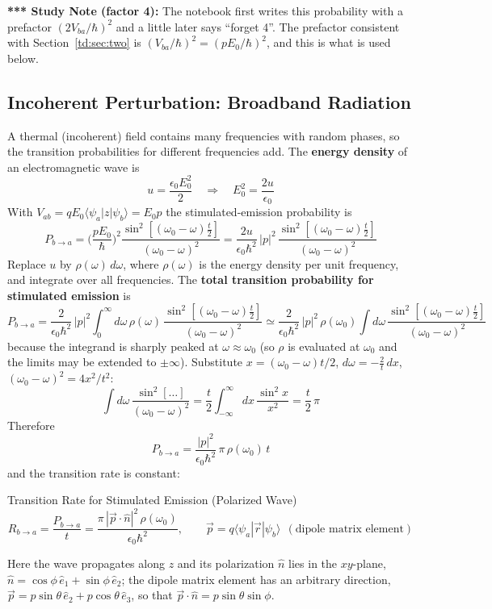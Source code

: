 \documentclass[11pt,a4paper]{article}
\begin{document}
\textbf{*** Study Note (factor 4):} The notebook first writes this probability with a prefactor $(2V_{ba}/\hbar)^2$ and a little later says ``forget 4''. The prefactor consistent with Section~\ref{td:sec:two} is $(V_{ba}/\hbar)^2=(pE_0/\hbar)^2$, and this is what is used below.

\subsection{Incoherent Perturbation: Broadband Radiation}
A thermal (incoherent) field contains many frequencies with random phases, so the transition probabilities for different frequencies add. The \textbf{energy density} of an electromagnetic wave is
\[
u=\frac{\epsilon_0E_0^2}2 \quad\Longrightarrow\quad E_0^2=\frac{2u}{\epsilon_0}
\]
With $V_{ab}=qE_0\langle\psi_a|z|\psi_b\rangle=E_0p$ the stimulated-emission probability is
\[
P_{b\to a}=\Big(\frac{pE_0}\hbar\Big)^2\frac{\sin^2[(\omega_0-\omega)\frac t2]}{(\omega_0-\omega)^2}
=\frac{2u}{\epsilon_0\hbar^2}\,|p|^2\,\frac{\sin^2[(\omega_0-\omega)\frac t2]}{(\omega_0-\omega)^2}
\]
Replace $u$ by $\rho(\omega)\,d\omega$, where $\rho(\omega)$ is the energy density per unit frequency, and integrate over all frequencies. The \textbf{total transition probability for stimulated emission} is
\[
P_{b\to a}=\frac2{\epsilon_0\hbar^2}\,|p|^2\int_0^\infty d\omega\,\rho(\omega)\,\frac{\sin^2[(\omega_0-\omega)\frac t2]}{(\omega_0-\omega)^2}
\simeq\frac2{\epsilon_0\hbar^2}\,|p|^2\,\rho(\omega_0)\int d\omega\,\frac{\sin^2[(\omega_0-\omega)\frac t2]}{(\omega_0-\omega)^2}
\]
because the integrand is sharply peaked at $\omega\approx\omega_0$ (so $\rho$ is evaluated at $\omega_0$ and the limits may be extended to $\pm\infty$). Substitute $x=(\omega_0-\omega)t/2$, $d\omega=-\tfrac2t\,dx$, $(\omega_0-\omega)^2=4x^2/t^2$:
\[
\int d\omega\,\frac{\sin^2[\ldots]}{(\omega_0-\omega)^2}=\frac t2\int_{-\infty}^{\infty}dx\,\frac{\sin^2x}{x^2}=\frac t2\,\pi
\]
Therefore
\[
P_{b\to a}=\frac{|p|^2}{\epsilon_0\hbar^2}\,\pi\,\rho(\omega_0)\,t
\]
and the transition rate is constant:
\begin{thm}{Transition Rate for Stimulated Emission (Polarized Wave)}
\[
R_{b\to a}=\frac{P_{b\to a}}t=\frac{\pi\,|\vec p\cdot\hat n|^2\,\rho(\omega_0)}{\epsilon_0\hbar^2}, \qquad \vec p=q\langle\psi_a|\vec r|\psi_b\rangle\ \ (\text{dipole matrix element})
\]
\end{thm}
Here the wave propagates along $z$ and its polarization $\hat n$ lies in the $xy$-plane, $\hat n=\cos\phi\,\hat e_1+\sin\phi\,\hat e_2$; the dipole matrix element has an arbitrary direction, $\vec p=p\sin\theta\,\hat e_2+p\cos\theta\,\hat e_3$, so that $\vec p\cdot\hat n=p\sin\theta\sin\phi$.
\end{document}
